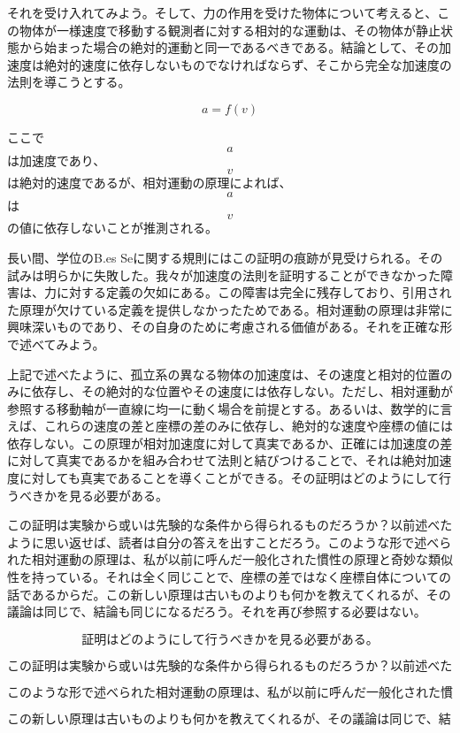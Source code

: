 \documentclass[a4paper,11pt,openany]{ltjsbook}
\begin{document}
それを受け入れてみよう。そして、力の作用を受けた物体について考えると、この物体が一様速度で移動する観測者に対する相対的な運動は、その物体が静止状態から始まった場合の絶対的運動と同一であるべきである。結論として、その加速度は絶対的速度に依存しないものでなければならず、そこから完全な加速度の法則を導こうとする。

$$a = f(v)$$

ここで $$a$$ は加速度であり、$$v$$ は絶対的速度であるが、相対運動の原理によれば、$$a$$ は $$v$$ の値に依存しないことが推測される。

長い間、学位のB.es Seに関する規則にはこの証明の痕跡が見受けられる。その試みは明らかに失敗した。我々が加速度の法則を証明することができなかった障害は、力に対する定義の欠如にある。この障害は完全に残存しており、引用された原理が欠けている定義を提供しなかったためである。相対運動の原理は非常に興味深いものであり、その自身のために考慮される価値がある。それを正確な形で述べてみよう。

上記で述べたように、孤立系の異なる物体の加速度は、その速度と相対的位置のみに依存し、その絶対的な位置やその速度には依存しない。ただし、相対運動が参照する移動軸が一直線に均一に動く場合を前提とする。あるいは、数学的に言えば、これらの速度の差と座標の差のみに依存し、絶対的な速度や座標の値には依存しない。この原理が相対加速度に対して真実であるか、正確には加速度の差に対して真実であるかを組み合わせて法則と結びつけることで、それは絶対加速度に対しても真実であることを導くことができる。その証明はどのようにして行うべきかを見る必要がある。

この証明は実験から或いは先験的な条件から得られるものだろうか？以前述べたように思い返せば、読者は自分の答えを出すことだろう。このような形で述べられた相対運動の原理は、私が以前に呼んだ一般化された慣性の原理と奇妙な類似性を持っている。それは全く同じことで、座標の差ではなく座標自体についての話であるからだ。この新しい原理は古いものよりも何かを教えてくれるが、その議論は同じで、結論も同じになるだろう。それを再び参照する必要はない。

$$\text{証明はどのようにして行うべきかを見る必要がある。}$$

$$\text{この証明は実験から或いは先験的な条件から得られるものだろうか？以前述べたように思い返せば、読者は自分の答えを出すことだろう。}$$

$$\text{このような形で述べられた相対運動の原理は、私が以前に呼んだ一般化された慣性の原理と奇妙な類似性を持っている。それは全く同じことで、座標の差ではなく座標自体についての話であるからだ。}$$

$$\text{この新しい原理は古いものよりも何かを教えてくれるが、その議論は同じで、結論も同じになるだろう。それを再び参照する必要はない。}$$
\end{document}
